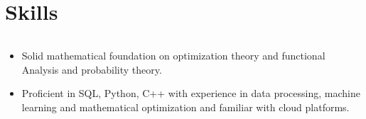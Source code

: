 \documentclass[a4paper,12pt]{article}
\begin{document}
\section{Skills}
\begin{tabularx}{\linewidth}{@{}l X@{}}
\end{tabularx}
\begin{itemize}
    \item Solid mathematical foundation on optimization theory and functional Analysis and probability theory.
    \item Proficient in SQL, Python, C++ with experience in data processing, machine learning and mathematical optimization and familiar with cloud platforms.
\end{itemize}



\vfill
{}
\end{document}
